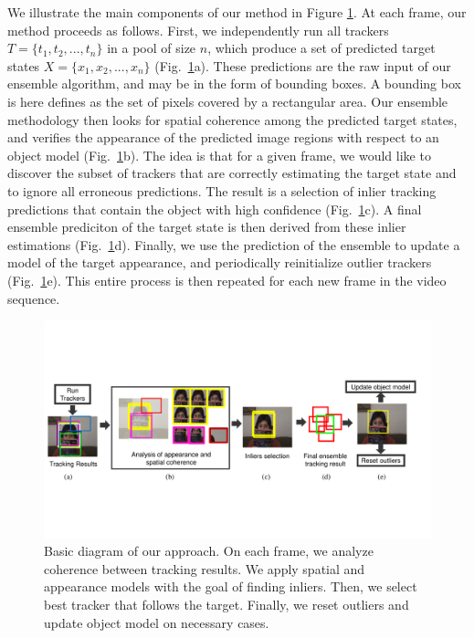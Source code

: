 We illustrate the main components of our method in
Figure \ref{fig::diagram}.
At each frame, our method proceeds as follows.
First, we independently run all trackers
$T = \{ t_1, t_2, ..., t_n \}$
in a pool of size $n$, which produce a set of predicted target
states
$X = \{ x_1, x_2, ..., x_n \}$ (Fig.~\ref{fig::diagram}a).
These predictions are the raw input of our ensemble algorithm,
and may be in the form of bounding boxes. A bounding box is here defines as the
set of pixels covered by a rectangular area.
Our ensemble methodology then looks for spatial coherence among the predicted
target states, and verifies the appearance of the predicted image regions
with respect to an object model
(Fig.~\ref{fig::diagram}b). The idea is that for a given frame,
we would like to discover the subset of trackers that are correctly
estimating the target state and to ignore all erroneous predictions.
The result is a selection of inlier tracking predictions
that contain the object with high confidence
(Fig.~\ref{fig::diagram}c).
A final ensemble prediciton of the target state is then derived from
these inlier estimations (Fig.~\ref{fig::diagram}d).
Finally, we use the prediction of the ensemble to update a model of the
target appearance, and periodically reinitialize outlier trackers
(Fig.~\ref{fig::diagram}e).
This entire process is then repeated for each new frame in the video sequence.

\begin{figure}[t!]
\centering
\includegraphics[width=1\linewidth, trim= 0cm 5.1cm 1.3cm 5.3cm, clip=true]{Figures/diagram}
\caption [Proposed methodology.]
    {\small Basic diagram of our approach. On each frame, we analyze coherence
        between tracking results. We apply spatial and appearance models with
        the goal of finding inliers. Then, we select best tracker that follows
        the target. Finally, we reset outliers and  update object model on
        necessary cases.
}
\label{fig::diagram}
\end{figure}


